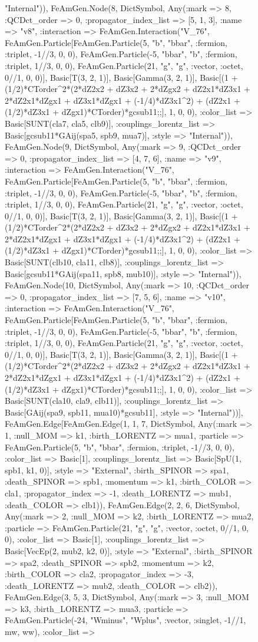 \documentclass{revtex4}
\begin{document}
\begin{figure}[!htb]
\begin{center}
{"Internal")), FeAmGen.Node(8, Dict{Symbol, Any}(:mark => 8, :QCDct_order => 0, :propagator_index_list => [5, 1, 3], :name => "v8", :interaction => FeAmGen.Interaction("V_76", FeAmGen.Particle[FeAmGen.Particle(5, "b", "bbar", :fermion, :triplet, -1//3, 0, 0), FeAmGen.Particle(-5, "bbar", "b", :fermion, :triplet, 1//3, 0, 0), FeAmGen.Particle(21, "g", "g", :vector, :octet, 0//1, 0, 0)], Basic[T(3, 2, 1)], Basic[Gamma(3, 2, 1)], Basic[(1 + (1/2)*CTorder^2*(2*dZ2x2 + dZ3x2 + 2*dZgx2 + dZ2x1*dZ3x1 + 2*dZ2x1*dZgx1 + dZ3x1*dZgx1 + (-1/4)*dZ3x1^2) + (dZ2x1 + (1/2)*dZ3x1 + dZgx1)*CTorder)*gcsub11;;], 1, 0, 0), :color_list => Basic[SUNT(cla7, cla5, clb9)], :couplings_lorentz_list => Basic[gcsub11*GAij(spa5, spb9, mua7)], :style => "Internal")), FeAmGen.Node(9, Dict{Symbol, Any}(:mark => 9, :QCDct_order => 0, :propagator_index_list => [4, 7, 6], :name => "v9", :interaction => FeAmGen.Interaction("V_76", FeAmGen.Particle[FeAmGen.Particle(5, "b", "bbar", :fermion, :triplet, -1//3, 0, 0), FeAmGen.Particle(-5, "bbar", "b", :fermion, :triplet, 1//3, 0, 0), FeAmGen.Particle(21, "g", "g", :vector, :octet, 0//1, 0, 0)], Basic[T(3, 2, 1)], Basic[Gamma(3, 2, 1)], Basic[(1 + (1/2)*CTorder^2*(2*dZ2x2 + dZ3x2 + 2*dZgx2 + dZ2x1*dZ3x1 + 2*dZ2x1*dZgx1 + dZ3x1*dZgx1 + (-1/4)*dZ3x1^2) + (dZ2x1 + (1/2)*dZ3x1 + dZgx1)*CTorder)*gcsub11;;], 1, 0, 0), :color_list => Basic[SUNT(clb10, cla11, clb8)], :couplings_lorentz_list => Basic[gcsub11*GAij(spa11, spb8, mub10)], :style => "Internal")), FeAmGen.Node(10, Dict{Symbol, Any}(:mark => 10, :QCDct_order => 0, :propagator_index_list => [7, 5, 6], :name => "v10", :interaction => FeAmGen.Interaction("V_76", FeAmGen.Particle[FeAmGen.Particle(5, "b", "bbar", :fermion, :triplet, -1//3, 0, 0), FeAmGen.Particle(-5, "bbar", "b", :fermion, :triplet, 1//3, 0, 0), FeAmGen.Particle(21, "g", "g", :vector, :octet, 0//1, 0, 0)], Basic[T(3, 2, 1)], Basic[Gamma(3, 2, 1)], Basic[(1 + (1/2)*CTorder^2*(2*dZ2x2 + dZ3x2 + 2*dZgx2 + dZ2x1*dZ3x1 + 2*dZ2x1*dZgx1 + dZ3x1*dZgx1 + (-1/4)*dZ3x1^2) + (dZ2x1 + (1/2)*dZ3x1 + dZgx1)*CTorder)*gcsub11;;], 1, 0, 0), :color_list => Basic[SUNT(cla10, cla9, clb11)], :couplings_lorentz_list => Basic[GAij(spa9, spb11, mua10)*gcsub11], :style => "Internal"))], FeAmGen.Edge[FeAmGen.Edge(1, 1, 7, Dict{Symbol, Any}(:mark => 1, :null_MOM => k1, :birth_LORENTZ => mua1, :particle => FeAmGen.Particle(5, "b", "bbar", :fermion, :triplet, -1//3, 0, 0), :color_list => Basic[1], :couplings_lorentz_list => Basic[SpU(1, spb1, k1, 0)], :style => "External", :birth_SPINOR => spa1, :death_SPINOR => spb1, :momentum => k1, :birth_COLOR => cla1, :propagator_index => -1, :death_LORENTZ => mub1, :death_COLOR => clb1)), FeAmGen.Edge(2, 2, 6, Dict{Symbol, Any}(:mark => 2, :null_MOM => k2, :birth_LORENTZ => mua2, :particle => FeAmGen.Particle(21, "g", "g", :vector, :octet, 0//1, 0, 0), :color_list => Basic[1], :couplings_lorentz_list => Basic[VecEp(2, mub2, k2, 0)], :style => "External", :birth_SPINOR => spa2, :death_SPINOR => spb2, :momentum => k2, :birth_COLOR => cla2, :propagator_index => -3, :death_LORENTZ => mub2, :death_COLOR => clb2)), FeAmGen.Edge(3, 5, 3, Dict{Symbol, Any}(:mark => 3, :null_MOM => k3, :birth_LORENTZ => mua3, :particle => FeAmGen.Particle(-24, "Wminus", "Wplus", :vector, :singlet, -1//1, mw, ww), :color_list => }
\end{center}
\end{figure}
\end{document}
